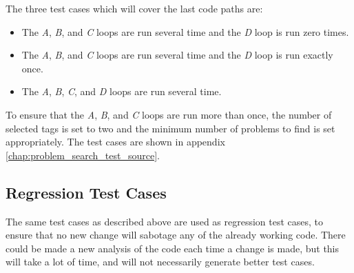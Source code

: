 The three test cases which will cover the last code paths are:
\begin{itemize}
	\item The \textit{A}, \textit{B}, and \textit{C} loops are run several time and the \textit{D} loop is run zero times.
	\item The \textit{A}, \textit{B}, and \textit{C} loops are run several time and the \textit{D} loop is run exactly once.
	\item The \textit{A}, \textit{B}, \textit{C}, and \textit{D} loops are run several time.
\end{itemize}
To ensure that the \textit{A}, \textit{B}, and \textit{C} loops are run more than once, the number of selected tags is set to two and the minimum number of problems to find is set appropriately.
The test cases are shown in appendix \ref{chap:problem_search_test_source}.

\subsection{Regression Test Cases}
\label{sec:regression_problem_search}
The same test cases as described above are used as regression test cases, to ensure that no new change will sabotage any of the already working code.
There could be made a new analysis of the code each time a change is made, but this will take a lot of time, and will not necessarily generate better test cases.

